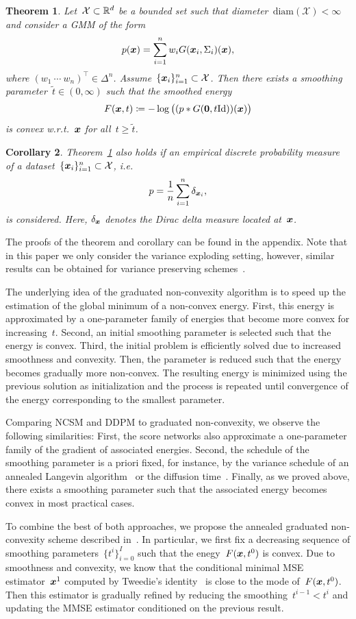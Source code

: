 \documentclass{article} %
\theoremstyle{plain}
\newtheorem{theorem}{Theorem}[section]
\newtheorem{corollary}[theorem]{Corollary}
\theoremstyle{definition}
\theoremstyle{remark}
\newcommand{\X}{\mathcal{X}}
\newcommand{\id}{\mathrm{Id}}
\renewcommand{\vec}[1]{\mathbf{#1}}
\newcommand{\diameter}{\mathrm{diam}}
\begin{document}
\begin{theorem}\label{thm:Fconvex}
Let~$\X\subset\R^d$ be a bounded set such that diameter~$\diameter(\X)<\infty$ and consider a GMM of the form
\[
p({\bm{x}}) = \sum_{i=1}^n w_i G({\bm{x}}_i,\Sigma_i)({\bm{x}}),
\]
where $(w_1\ \cdots \ w_n)^\top\in\Delta^n$. Assume~$\{\vx_i\}_{i=1}^n\subset\X$.
Then there exists a smoothing parameter~$\widetilde{t}\in(0,\infty)$ such that the smoothed energy
\[
F(\vx,t)\coloneqq -\log \big( (p \ast G(\vec{0}, t\id))(\vx)\big)
\]
is \emph{convex} w.r.t.~${\bm{x}}$ for all~$t\geq\widetilde{t}$.
\end{theorem}
\begin{corollary}
Theorem~\ref{thm:Fconvex} also holds if an empirical discrete probability measure of a dataset~$\{\vx_i\}_{i=1}^n\subset\X$, i.e.
\[
p = \frac{1}{n}\sum_{i=1}^n\delta_{{\bm{x}}_i},
\]
is considered.
Here, $\delta_{{\bm{x}}}$ denotes the Dirac delta measure located at~${\bm{x}}$.
\end{corollary}
The proofs of the theorem and corollary can be found in the appendix.
Note that in this paper we only consider the variance exploding setting, however, similar results can be obtained for variance preserving schemes~\citep{SoSo20}. 

The underlying idea of the graduated non-convexity algorithm is to speed up the estimation of the global minimum of a non-convex energy.
First, this energy is approximated by a one-parameter family of energies that become more convex for increasing~$t$.
Second, an initial smoothing parameter is selected such that the energy is convex.
Third, the initial problem is efficiently solved due to increased smoothness and convexity.
Then, the parameter is reduced such that the energy becomes gradually more non-convex.
The resulting energy is minimized using the previous solution as initialization and the process is repeated until convergence of the energy corresponding to the smallest parameter.

Comparing NCSM and DDPM to graduated non-convexity, we observe the following similarities:
First, the score networks also approximate a one-parameter family of the gradient of associated energies.
Second, the schedule of the smoothing parameter is a priori fixed, for instance, by the variance schedule of an annealed Langevin algorithm~\citep{SoEr19} or the diffusion time~\citep{HoJa20}.
Finally, as we proved above, there exists a smoothing parameter such that the associated energy becomes convex in most practical cases.

To combine the best of both approaches, we propose the annealed graduated non-convexity scheme described in~.
In particular, we first fix a decreasing sequence of smoothing parameters~$\{t^i\}_{i=0}^I$ such that the enegy~$F({\bm{x}},t^0)$ is convex.
Due to smoothness and convexity, we know that the conditional minimal MSE estimator~${\bm{x}}^1$ computed by Tweedie's identity~\citep{Ro56,Ef11} is close to the mode of~$F({\bm{x}},t^0)$.
Then this estimator is gradually refined by reducing the smoothing~$t^{i-1}<t^i$ and updating the MMSE estimator conditioned on the previous result.
\end{document}

